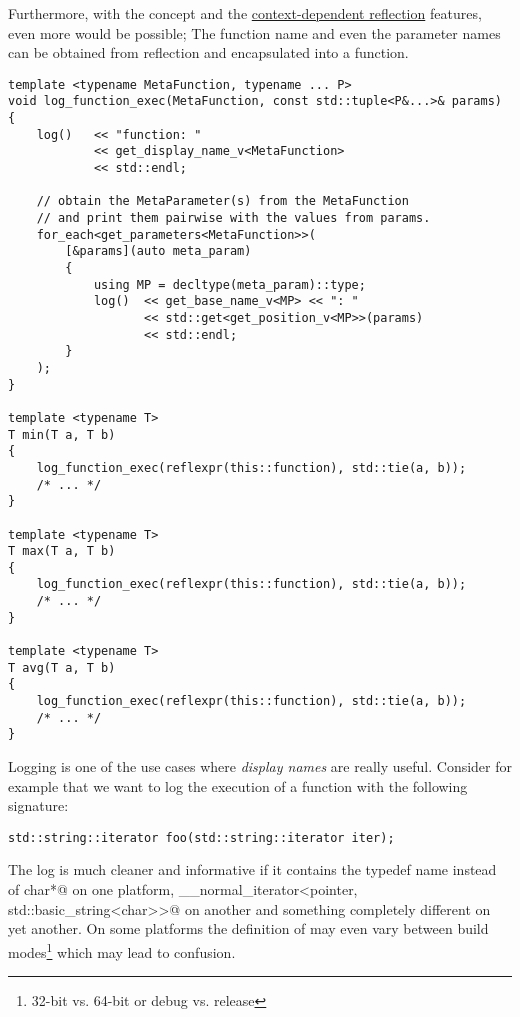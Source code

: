 Furthermore, with the  concept and the
\hyperref[context-dependent-reflection]{context-dependent reflection} features,
even more would be possible; The function name and even the parameter names can
be obtained from reflection and encapsulated into a function.

\begin{verbatim}
template <typename MetaFunction, typename ... P>
void log_function_exec(MetaFunction, const std::tuple<P&...>& params)
{
	log()   << "function: "
	        << get_display_name_v<MetaFunction>
	        << std::endl;

	// obtain the MetaParameter(s) from the MetaFunction
	// and print them pairwise with the values from params.
	for_each<get_parameters<MetaFunction>>(
		[&params](auto meta_param)
		{
			using MP = decltype(meta_param)::type;
			log()  << get_base_name_v<MP> << ": "
			       << std::get<get_position_v<MP>>(params)
			       << std::endl;
		}
	);
}

template <typename T>
T min(T a, T b)
{
	log_function_exec(reflexpr(this::function), std::tie(a, b));
	/* ... */
}

template <typename T>
T max(T a, T b)
{
	log_function_exec(reflexpr(this::function), std::tie(a, b));
	/* ... */
}

template <typename T>
T avg(T a, T b)
{
	log_function_exec(reflexpr(this::function), std::tie(a, b));
	/* ... */
}
\end{verbatim}

Logging is one of the use cases where {\em display names} are really useful.
Consider for example that we want to log the execution of a function with
the following signature:

\begin{verbatim}
std::string::iterator foo(std::string::iterator iter);
\end{verbatim}

The log is much cleaner and informative if it contains the typedef name
\verb@iterator@ instead of \verb@const char*@ on one platform,
\verb@__normal_iterator<pointer, std::basic_string<char>>@ on another and
something completely different on yet another. On some platforms the definition
of \verb@iterator@ may even vary between build modes\footnote{32-bit vs. 64-bit or 
debug vs. release} which may lead to confusion.
